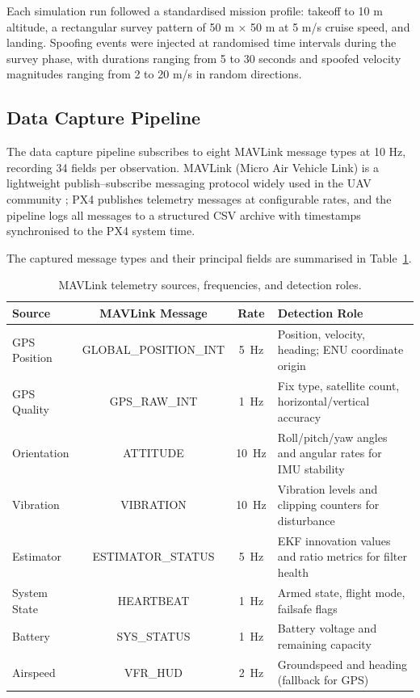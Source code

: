 \documentclass[electronics,article,accept,moreauthors]{Definitions/mdpi}
\begin{document}
Each simulation run followed a standardised mission profile: takeoff to 10 m altitude, a rectangular survey pattern of 50 m $\times$ 50 m at 5 m/s cruise speed, and landing. Spoofing events were injected at randomised time intervals during the survey phase, with durations ranging from 5 to 30 seconds and spoofed velocity magnitudes ranging from 2 to 20 m/s in random directions.

\subsection{Data Capture Pipeline}
\label{sec:datacapture}

The data capture pipeline subscribes to eight MAVLink message types at 10 Hz, recording 34 fields per observation. MAVLink (Micro Air Vehicle Link) is a lightweight publish--subscribe messaging protocol widely used in the UAV community \citep{mavlink}; PX4 publishes telemetry messages at configurable rates, and the pipeline logs all messages to a structured CSV archive with timestamps synchronised to the PX4 system time.

The captured message types and their principal fields are summarised in Table~\ref{tab:messages}.

\begin{table}[H]
 \caption{MAVLink telemetry sources, frequencies, and detection roles.\label{tab:messages}}
\begin{tabularx}{\textwidth}{lccX}
\toprule
\textbf{Source} & \textbf{MAVLink Message} & \textbf{Rate} & \textbf{Detection Role} \\
\midrule
GPS Position & GLOBAL\_POSITION\_INT & 5~Hz & Position, velocity, heading; ENU coordinate origin \\
GPS Quality & GPS\_RAW\_INT & 1~Hz & Fix type, satellite count, horizontal/vertical accuracy \\
Orientation & ATTITUDE & 10~Hz & Roll/pitch/yaw angles and angular rates for IMU stability \\
Vibration & VIBRATION & 10~Hz & Vibration levels and clipping counters for disturbance \\
Estimator & ESTIMATOR\_STATUS & 5~Hz & EKF innovation values and ratio metrics for filter health \\
System State & HEARTBEAT & 1~Hz & Armed state, flight mode, failsafe flags \\
Battery & SYS\_STATUS & 1~Hz & Battery voltage and remaining capacity \\
Airspeed & VFR\_HUD & 2~Hz & Groundspeed and heading (fallback for GPS) \\
\bottomrule
\end{tabularx}
\end{table}
\end{document}
